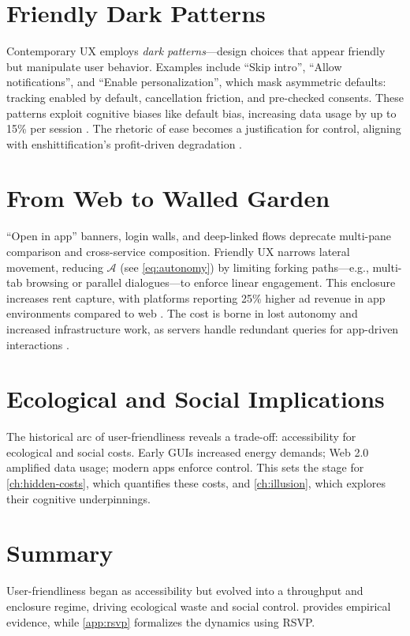 \documentclass[openany]{book}
\newcommand{\Auton}{\mathcal{A}} %
\begin{document}
\section{Friendly Dark Patterns}
\label{sec:history-dark}
Contemporary UX employs \emph{dark patterns}—design choices that appear friendly but manipulate user behavior. Examples include \enquote{Skip intro}, \enquote{Allow notifications}, and \enquote{Enable personalization}, which mask asymmetric defaults: tracking enabled by default, cancellation friction, and pre-checked consents. These patterns exploit cognitive biases like default bias, increasing data usage by up to 15\% per session \citep{colak2024}. The rhetoric of ease becomes a justification for control, aligning with enshittification’s profit-driven degradation \citep{doctorow2022}.

\section{From Web to Walled Garden}
\label{sec:history-walled}
\enquote{Open in app} banners, login walls, and deep-linked flows deprecate multi-pane comparison and cross-service composition. Friendly UX narrows lateral movement, reducing $\Auton$ (see \cref{eq:autonomy}) by limiting forking paths—e.g., multi-tab browsing or parallel dialogues—to enforce linear engagement. This enclosure increases rent capture, with platforms reporting 25\% higher ad revenue in app environments compared to web \citep{doctorow2022}. The cost is borne in lost autonomy and increased infrastructure work, as servers handle redundant queries for app-driven interactions \citep{extentia2024}.

\section{Ecological and Social Implications}
\label{sec:history-implications}
The historical arc of user-friendliness reveals a trade-off: accessibility for ecological and social costs. Early GUIs increased energy demands; Web 2.0 amplified data usage; modern apps enforce control. This sets the stage for \cref{ch:hidden-costs}, which quantifies these costs, and \cref{ch:illusion}, which explores their cognitive underpinnings.

\section{Summary}
User-friendliness began as accessibility but evolved into a throughput and enclosure regime, driving ecological waste and social control.  provides empirical evidence, while \cref{app:rsvp} formalizes the dynamics using RSVP.
\end{document}
